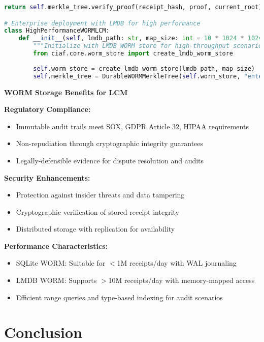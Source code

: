 \documentclass[12pt,a4paper]{article}
\begin{document}
\begin{lstlisting}[language=Python, caption=WORM-Enabled LCM Implementation]
        return self.merkle_tree.verify_proof(receipt_hash, proof, current_root)

# Enterprise deployment with LMDB for high performance
class HighPerformanceWORMLCM:
    def __init__(self, lmdb_path: str, map_size: int = 10 * 1024 * 1024 * 1024):
        """Initialize with LMDB WORM store for high-throughput scenarios"""
        from ciaf.core.worm_store import create_lmdb_worm_store
        
        self.worm_store = create_lmdb_worm_store(lmdb_path, map_size)
        self.merkle_tree = DurableWORMMerkleTree(self.worm_store, "enterprise_lcm")
\end{lstlisting}

\begin{infobox}
\textbf{WORM Storage Benefits for LCM}

\textbf{Regulatory Compliance:}
\begin{itemize}
\item Immutable audit trails meet SOX, GDPR Article 32, HIPAA requirements
\item Non-repudiation through cryptographic integrity guarantees
\item Legally-defensible evidence for dispute resolution and audits
\end{itemize}

\textbf{Security Enhancements:}
\begin{itemize}
\item Protection against insider threats and data tampering
\item Cryptographic verification of stored receipt integrity
\item Distributed storage with replication for availability
\end{itemize}

\textbf{Performance Characteristics:}
\begin{itemize}
\item SQLite WORM: Suitable for $<$1M receipts/day with WAL journaling
\item LMDB WORM: Supports $>$10M receipts/day with memory-mapped access
\item Efficient range queries and type-based indexing for audit scenarios
\end{itemize}
\end{infobox}

\section{Conclusion}
\end{document}
